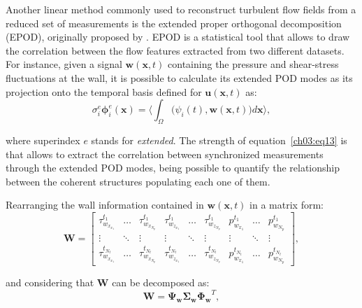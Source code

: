Another linear method commonly used to reconstruct turbulent flow fields from a reduced set of measurements is the extended proper orthogonal decomposition (EPOD), originally proposed by \citet{maurel2001extended}.
EPOD is a statistical tool that allows to draw the correlation between the flow features extracted from two different datasets.
For instance, given a signal $\boldsymbol{w}(\boldsymbol{x}, t)$ containing the pressure and shear-stress fluctuations at the wall, it is possible to calculate its extended POD modes as its projection onto the temporal basis defined for $\boldsymbol{u}(\boldsymbol{x}, t)$ as:
\begin{equation}
  \sigma_i^e\boldsymbol{\phi}_i^e(\boldsymbol{x})=\biggl\langle\int_{\Omega} \bigl(\psi_i(t),\boldsymbol{w}(\boldsymbol{x}, t)\bigl)d\boldsymbol{x}\biggl\rangle,
  \label{ch03:eq13}
\end{equation}

\noindent where superindex $e$ stands for \textit{extended}.
The strength of equation~\ref{ch03:eq13} is that allows to extract the correlation between synchronized measurements through the extended POD modes, being possible to quantify the relationship between the coherent structures populating each one of them.

Rearranging the wall information contained in $\boldsymbol{w}(\boldsymbol{x}, t)$ in a matrix form:
\begin{equation}
  \mathbf{W}=\begin{bmatrix}
      \tau_{w_{x_{x_1}}}^{t_1} & \dots  & \tau_{w_{x_{N_p}}}^{t_1} & \tau_{w_{z_{x_1}}}^{t_1} & \dots  & \tau_{w_{z_{N_p}}}^{t_1} & p_{w_{x_1}}^{t_1} & \dots  & p_{w_{N_p}}^{t_1}\\
      \vdots         & \ddots & \vdots         & \vdots         & \ddots & \vdots  & \vdots         & \ddots & \vdots \\
      \tau_{w_{x_{x_1}}}^{t_{N_t}} & \dots  & \tau_{w_{x_{N_p}}}^{t_{N_t}} & \tau_{w_{z_{x_1}}}^{t_{N_t}} & \dots  & \tau_{w_{z_{N_p}}}^{t_{N_t}}  & p_{w_{x_1}}^{t_{N_t}} & \dots  & p_{w_{N_p}}^{t_{N_t}}
      \end{bmatrix},
  \label{ch03:eq14}
\end{equation}

\noindent and considering that $\mathbf{W}$ can be decomposed as:
\begin{equation}
  \boldsymbol{W} =  \boldsymbol{\Psi_w}\boldsymbol{\Sigma_w}\boldsymbol{\Phi_w}^T,
  \label{ch03:eq15}
\end{equation}

